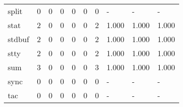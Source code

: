 \begin{longtable}{lp{2.0cm}p{2.0cm}p{2.0cm}p{2.0cm}p{2.0cm}p{2.0cm}p{2.0cm}p{2.0cm}p{2.0cm}}
split     &                      0 &                                  0 &                                 0 &                                0 &                                 0 &                               0 &                                    - &                                      - &                                    - \\
stat      &                      2 &                                  0 &                                 0 &                                0 &                                 0 &                               2 &                                1.000 &                                  1.000 &                                1.000 \\
stdbuf    &                      2 &                                  0 &                                 0 &                                0 &                                 0 &                               2 &                                1.000 &                                  1.000 &                                1.000 \\
stty      &                      2 &                                  0 &                                 0 &                                0 &                                 0 &                               2 &                                1.000 &                                  1.000 &                                1.000 \\
sum       &                      3 &                                  0 &                                 0 &                                0 &                                 0 &                               3 &                                1.000 &                                  1.000 &                                1.000 \\
sync      &                      0 &                                  0 &                                 0 &                                0 &                                 0 &                               0 &                                    - &                                      - &                                    - \\
tac       &                      0 &                                  0 &                                 0 &                                0 &                                 0 &                               0 &                                    - &                                      - &                                    - \\

\end{longtable}

